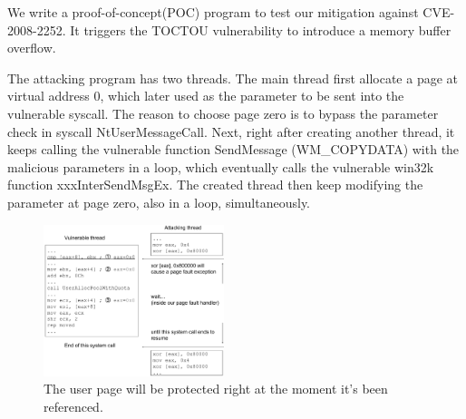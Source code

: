 We write a proof-of-concept(POC) program to test our mitigation against CVE-2008-2252. It triggers the TOCTOU vulnerability to introduce a memory buffer overflow. 


The attacking program has two threads. The main thread first allocate a page at virtual address 0, which later used as the parameter to be sent into the vulnerable syscall. The reason to choose page zero is to bypass the parameter check in syscall NtUserMessageCall. Next, right after creating another thread, it keeps calling the vulnerable function SendMessage (WM\_COPYDATA) with the malicious parameters in a loop, which eventually calls the vulnerable win32k function xxxInterSendMsgEx. The created thread then keep modifying the parameter at page zero, also in a loop, simultaneously.

\begin{figure}[th]
  \includegraphics[width=0.47\textwidth]{figures/ms08061case}
  \centering
  \caption{The user page will be protected right at the moment it's been referenced.}
  \label{fig:ms08061case}
\end{figure}

